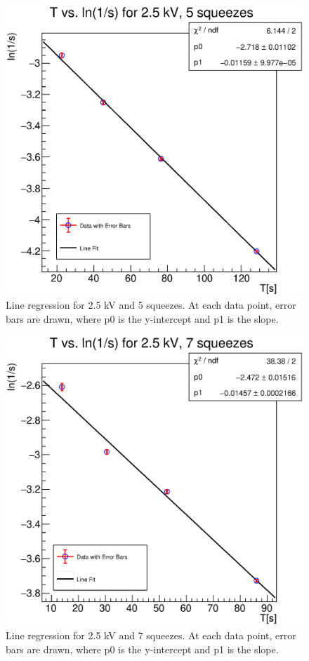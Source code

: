 \documentclass[reprint,amsmath,aps,nofootinbib,english]{revtex4-2}
\begin{document}
\begin{figure}[H]
  \includegraphics[width=0.95\columnwidth]{graphics/25_5.eps}
  \caption{Line regression for 2.5 kV and 5 squeezes. At each data point, error bars are drawn, where p0 is the y-intercept and p1 is the slope.}
\end{figure}




\begin{figure}[H]
  \includegraphics[width=0.95\columnwidth]{graphics/25_7.eps}
  \caption{Line regression for 2.5 kV and 7 squeezes. At each data point, error bars are drawn, where p0 is the y-intercept and p1 is the slope.}
\end{figure}
\end{document}

